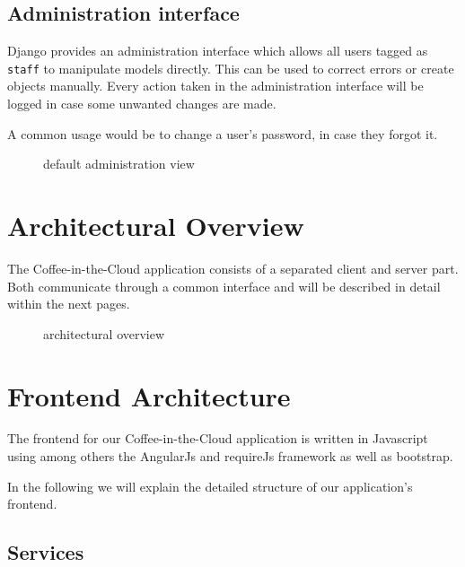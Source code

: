 \subsection{Administration interface}\label{administration-interface}

Django provides an administration interface which allows all users
tagged as \texttt{staff} to manipulate models directly. This can be used
to correct errors or create objects manually. Every action taken in the
administration interface will be logged in case some unwanted changes
are made.

A common usage would be to change a user's password, in case they forgot
it.

\begin{figure}[htbp]
\centering
{}
\caption{default administration view}
\end{figure}

\newpage
\newpage
\section{Architectural Overview}\label{architectural-overview}

The Coffee-in-the-Cloud application consists of a separated client and
server part. Both communicate through a common interface and will be
described in detail within the next pages.

\begin{figure}[htbp]
\centering
{}
\caption{architectural overview}
\end{figure}

\newpage
\newpage
\section{Frontend Architecture}\label{frontend-architecture}

The frontend for our Coffee-in-the-Cloud application is written in
Javascript using among others the AngularJs and requireJs framework as
well as bootstrap.

In the following we will explain the detailed structure of our
application's frontend.

\subsection{Services}\label{services}

